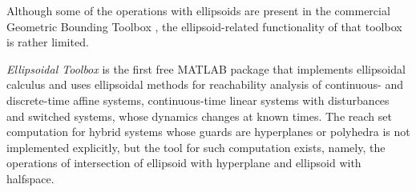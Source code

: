Although some of the operations with ellipsoids are present in the
commercial Geometric Bounding Toolbox \cite{VERES_KUNSEVICH_VALYI_HERMSMEYER_WALL_GEOMETRIC_BOUNDING_TOOLBOX, GEOMETRIC_BOUNDING_TOOLBOX_HOMEPAGE}, the
ellipsoid-related functionality of that toolbox is rather limited.

{\it Ellipsoidal Toolbox} is the first free MATLAB package that
implements ellipsoidal calculus and uses ellipsoidal methods
for reachability analysis of continuous- and discrete-time affine
systems, continuous-time linear systems with disturbances and switched
systems, whose dynamics changes at known times.
The reach set computation for hybrid systems whose guards are hyperplanes
or polyhedra is not implemented explicitly, but the tool for such computation
exists, namely, the operations of intersection of ellipsoid with hyperplane
and ellipsoid with halfspace.


